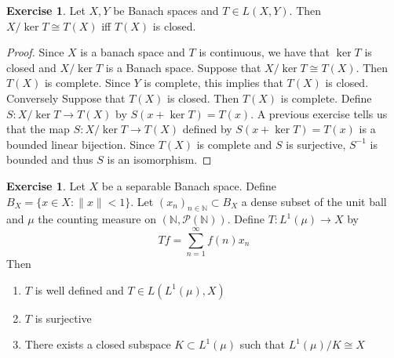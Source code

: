 \documentclass[12pt]{amsart}
\theoremstyle{definition}
\theoremstyle{remark}
\theoremstyle{definition}
\newtheorem{ex}[definition]{Exercise}
\newcommand{\N}{\mathbb{N}}
\newcommand{\MP}{\mathcal{P}}
\begin{document}
	\begin{ex}
		Let $X, Y$ be Banach spaces and $T \in L(X,Y)$. Then $X/\ker T \cong T(X)$ iff $T(X)$ is closed.
	\end{ex}
	
	\begin{proof}
		Since $X$ is a banach space and $T$ is continuous, we have that $\ker T$ is closed and $X/ \ker T$ is a Banach space. Suppose that $X/ \ker T \cong T(X)$. Then $T(X)$ is complete. Since $Y$ is complete, this implies that $T(X)$ is closed. \\
		Conversely Suppose that $T(X)$ is closed. Then $T(X)$ is complete. Define $S: X/ \ker T \rightarrow T(X)$ by $S(x + \ker T) = T(x)$. A previous exercise tells us that the map $S: X/ \ker T \rightarrow T(X)$ defined by $S(x + \ker T) = T(x)$ is a bounded linear bijection. Since $T(X)$ is complete and $S$ is surjective, $S^{-1}$ is bounded and thus $S$ is an isomorphism.   
	\end{proof}
	
	\begin{ex}
		Let $X$ be a separable Banach space. Define $B_X = \{x \in X: \|x \|< 1\}$. Let $(x_n)_{n \in \N} \subset B_X $ a dense subset of the unit ball and $\mu$ the counting measure on $(\N, \MP(\N))$. Define $T: L^1(\mu) \rightarrow X$ by $$Tf = \sum_{n=1}^{\infty}f(n)x_n$$ Then 
		\begin{enumerate}
			\item $T$ is well defined and $T \in L(L^1(\mu), X)$
			\item $T$ is surjective
			\item There exists a closed subspace $K \subset L^1(\mu)$ such that $L^1(\mu)/K \cong X$ 
		\end{enumerate} 
	\end{ex}
	
\end{document}
